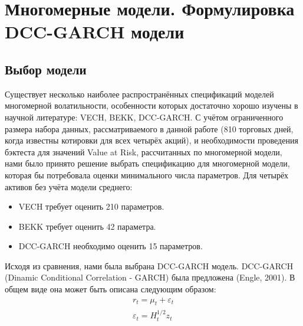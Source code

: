 \documentclass[a4paper,11pt]{article}
\begin{document}

\section{Многомерные модели. Формулировка DCC-GARCH модели}\label{mgarch}

\subsection{Выбор модели}\label{model selection}

Существует несколько наиболее распространённых спецификаций моделей многомерной волатильности, особенности которых достаточно хорошо изучены в научной литературе: VECH, BEKK, DCC-GARCH. С учётом ограниченного размера набора данных, рассматриваемого в данной работе (810 торговых дней, когда известны котировки для всех четырёх акций), и необходимости проведения бэктеста для значений Value at Risk, рассчитанных по многомерной модели, нами было принято решение выбрать спецификацию для многомерной модели, которая бы потребовала оценки минимального числа параметров. Для четырёх активов без учёта модели среднего:
\begin{itemize}
    \item VECH требует оценить 210 параметров.
    \item BEKK требует оценить 42 параметра.
    \item DCC-GARCH необходимо оценить 15 параметров.
\end{itemize}

Исходя из сравнения, нами была выбрана DCC-GARCH модель. DCC-GARCH (Dinamic Conditional Correlation - GARCH) была предложена (Engle, 2001). В общем виде она может быть описана следующим образом:
\begin{equation}
\begin{aligned}
               r_t = \mu_t + \varepsilon_t \\
               \varepsilon_t = H^{1/2}_t z_t
\end{aligned}
\end{equation}
\end{document}

